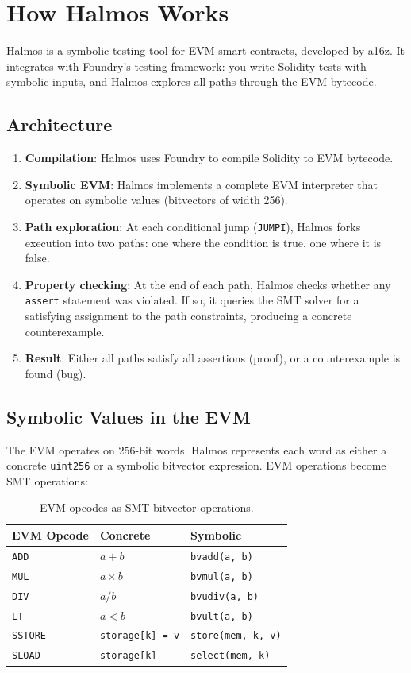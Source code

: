 \section{How Halmos Works}


Halmos is a symbolic testing tool for EVM smart contracts, developed by a16z. It
integrates with Foundry's testing framework: you write Solidity tests with symbolic inputs,
and Halmos explores all paths through the EVM bytecode.

\subsection{Architecture}

\begin{enumerate}
  \item \textbf{Compilation}: Halmos uses Foundry to compile Solidity to EVM bytecode.
  \item \textbf{Symbolic EVM}: Halmos implements a complete EVM interpreter that operates
    on symbolic values (bitvectors of width 256).
  \item \textbf{Path exploration}: At each conditional jump (\texttt{JUMPI}), Halmos forks
    execution into two paths: one where the condition is true, one where it is false.
  \item \textbf{Property checking}: At the end of each path, Halmos checks whether any
    \texttt{assert} statement was violated. If so, it queries the SMT solver for a
    satisfying assignment to the path constraints, producing a concrete counterexample.
  \item \textbf{Result}: Either all paths satisfy all assertions (proof), or a
    counterexample is found (bug).
\end{enumerate}

\subsection{Symbolic Values in the EVM}

The EVM operates on 256-bit words. Halmos represents each word as either a concrete
\texttt{uint256} or a symbolic bitvector expression. EVM operations become SMT operations:

\begin{table}[H]
\centering
\small
\begin{tabular}{@{}lll@{}}
\toprule
\textbf{EVM Opcode} & \textbf{Concrete} & \textbf{Symbolic} \\
\midrule
\texttt{ADD} & $a + b$ & \texttt{bvadd(a, b)} \\
\texttt{MUL} & $a \times b$ & \texttt{bvmul(a, b)} \\
\texttt{DIV} & $a / b$ & \texttt{bvudiv(a, b)} \\
\texttt{LT} & $a < b$ & \texttt{bvult(a, b)} \\
\texttt{SSTORE} & \texttt{storage[k] = v} & \texttt{store(mem, k, v)} \\
\texttt{SLOAD} & \texttt{storage[k]} & \texttt{select(mem, k)} \\
\bottomrule
\end{tabular}
\caption{EVM opcodes as SMT bitvector operations.}
\end{table}

